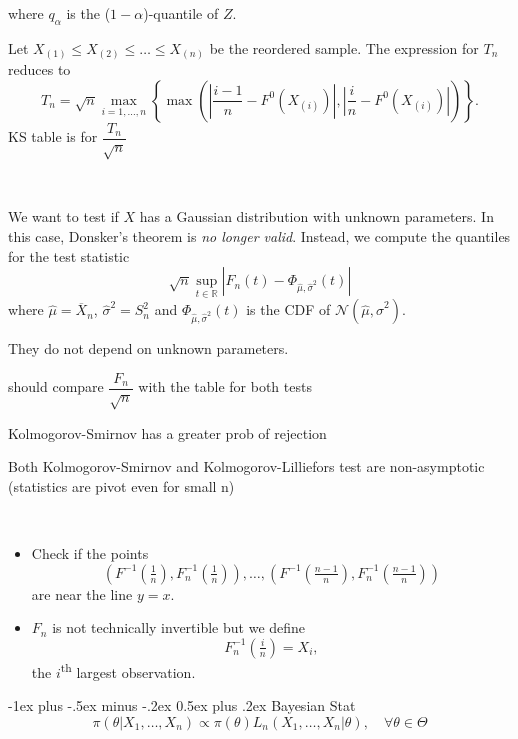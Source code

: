 \documentclass[a4paper, 10pt,landscape]{article}
\makeatletter
\renewcommand{\section}{\@startsection{section}{1}{0mm}%
                                {-1ex plus -.5ex minus -.2ex}%
                                {0.5ex plus .2ex}%
                                {\normalfont\large\bfseries}}
\makeatother
\begin{document}
\begin{multicols*}{4}
\begin{description}
\begin{description}
				where $q_\alpha$ is the ($1-\alpha$)-quantile of $Z$.
				\item Let $X_{(1)}\leq X_{(2)}\leq\dots\leq X_{(n)}$ be the reordered sample. The expression for $T_n$ reduces to
				$$T_n=\sqrt{n}\max\limits_{i=1,\dots,n}\left\{\max\left(\left|\dfrac{i-1}{n}-F^0\left(X_{(i)}\right)\right|,\left|\dfrac{i}{n}-F^0\left(X_{(i)}\right)\right|\right)\right\}.$$
				KS table is for $\dfrac{T_n}{\sqrt{n}}$
			\end{description}	
		\item[Kolmogorov-Lilliefors Test]~
			\begin{description}		
				\item We want to test if $X$ has a Gaussian distribution with unknown parameters. In this case, Donsker's theorem is {\it no longer valid}. Instead, we compute the quantiles for the test statistic
				$$\sqrt{n}\sup\limits_{t\in\mathbb{R}}\left|F_n(t)-\Phi_{\hat{\mu},\hat{\sigma}^2}(t)\right|$$
				where $\hat{\mu}=\overline{X}_n$, $\hat{\sigma}^2=S_n^2$ and $\Phi_{\hat{\mu},\hat{\sigma}^2}(t)$ is the CDF of $\mathcal{N}\left(\hat{\mu},\hat{\sigma}^2\right).$
				\item They do not depend on unknown parameters.
				\item should compare $\dfrac{F_n}{\sqrt{n}}$ with the table for both tests
				\item Kolmogorov-Smirnov has a greater prob of rejection
				\item Both Kolmogorov-Smirnov and Kolmogorov-Lilliefors test are non-asymptotic (statistics are pivot even for small n)
			\end{description}
		\item[QQ plot]~
			\begin{itemize}
				\item Check if the points
				$$\left(F^{-1}(\tfrac{1}{n}),F_n^{-1}(\tfrac{1}{n})\right),\dots,\left(F^{-1}(\tfrac{n-1}{n}),F_n^{-1}(\tfrac{n-1}{n})\right)$$
				are near the line $y=x.$
				\item $F_n$ is not technically invertible but we define
				$$F_n^{-1}(\tfrac{i}{n})=X_i,$$
				the $i$\textsuperscript{th} largest observation.
			\end{itemize}		
	\end{description}

\section{Bayesian Stat}
$$\pi\left(\theta|X_1,\dots,X_n\right)\propto\pi(\theta)L_n(X_1,\dots,X_n|\theta),\quad\forall\theta\in\Theta$$


\end{multicols*}
\end{document}
